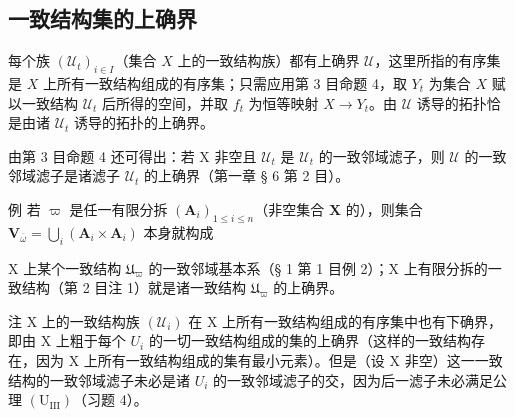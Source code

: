 \subsection{一致结构集的上确界}

每个族 \((\mathcal{U}_t)_{i\in I}\)（集合 \(X\) 上的一致结构族）都有上确界 \(\mathcal{U}\)，这里所指的有序集是 \(X\) 上所有一致结构组成的有序集；只需应用第 3 目命题 4，取 \(Y_t\) 为集合 \(X\) 赋以一致结构 \(\mathcal{U}_t\) 后所得的空间，并取 \(f_t\) 为恒等映射 \(X\to Y_t\)。由 \(\mathcal{U}\) 诱导的拓扑恰是由诸 \(\mathcal{U}_t\) 诱导的拓扑的上确界。

由第 3 目命题 4 还可得出：若 X 非空且 \(\mathcal{U}_{t}\) 是 \(\mathcal{U}_{t}\) 的一致邻域滤子，则 \(\mathcal{U}\) 的一致邻域滤子是诸滤子 \(\mathcal{U}_{t}\) 的上确界（第一章 § 6 第 2 目）。

例 若 \(\varpi\) 是任一有限分拆 \((\mathbf{A}_i)_{1 \leqslant i \leqslant n}\)（非空集合 \(\mathbf{X}\) 的），则集合 \(\mathbf{V}_{\overline{\omega}} = \bigcup_{i} (\mathbf{A}_i \times \mathbf{A}_i)\) 本身就构成

X 上某个一致结构 \(\mathfrak{U}_{\varpi}\) 的一致邻域基本系（§ 1 第 1 目例 2）；X 上有限分拆的一致结构（第 2 目注 1）就是诸一致结构 \(\mathfrak{U}_{\varpi}\) 的上确界。

注 X 上的一致结构族 \((\mathcal{U}_{i})\) 在 X 上所有一致结构组成的有序集中也有下确界，即由 X 上粗于每个 \(U_{i}\) 的一切一致结构组成的集的上确界（这样的一致结构存在，因为 X 上所有一致结构组成的集有最小元素）。但是（设 X 非空）这一一致结构的一致邻域滤子未必是诸 \(U_{i}\) 的一致邻域滤子的交，因为后一滤子未必满足公理 \((\mathrm{U}_{\mathrm{III}})\)（习题 4）。

